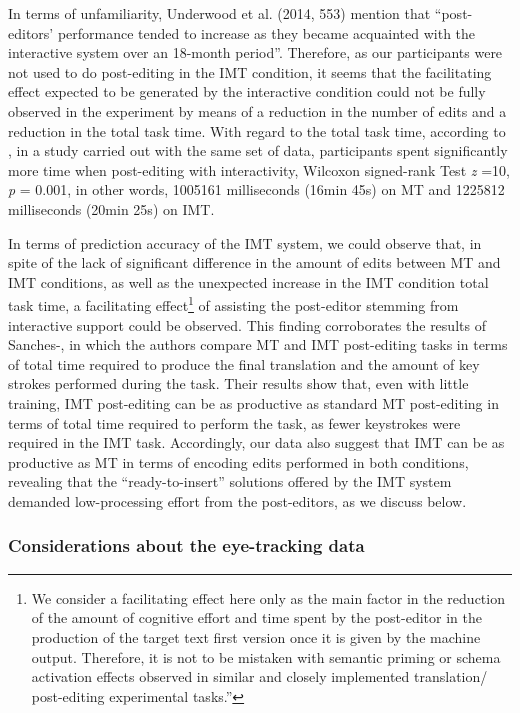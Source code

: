 \documentclass[output=paper]{langsci/langscibook}
\begin{document}
In terms of unfamiliarity, Underwood et al. (2014, 553) mention that “post-editors’ performance tended to increase as they became acquainted with the interactive system over an 18-month period”.  Therefore, as our participants were not used to do post-editing in the IMT condition, it seems that the facilitating effect expected to be generated by the interactive condition could not be fully observed in the experiment by means of a reduction in the number of edits and a reduction in the total task time. With regard to the total task time, according to \citet{AlvesEtAl2015}, in a study carried out with the same set of data, participants spent significantly more time when post-editing with interactivity, Wilcoxon signed-rank Test\textit{ z} =10, \textit{p} = 0.001, in other words, 1005161 milliseconds (16min 45s) on MT and 1225812 milliseconds (20min 25s) on IMT. 



In terms of prediction accuracy of the IMT system, we could observe that, in spite of the lack of significant difference in the amount of edits between MT and IMT conditions, as well as the unexpected increase in the IMT condition total task time, a facilitating effect\footnote{ We consider a facilitating effect here only as the main factor in the reduction of the amount of cognitive effort and time spent by the post-editor in the production of the target text first version once it is given by the machine output. Therefore, it is not to be mistaken with semantic priming or schema activation effects observed in similar and closely implemented translation/ post-editing experimental tasks.”} of assisting the post-editor stemming from interactive support could be observed. This finding corroborates the results of Sanches-\citet{TrillesEtAl2014}, in which the authors compare MT and IMT post-editing tasks in terms of total time required to produce the final translation and the amount of key strokes performed during the task. Their results show that, even with little training, IMT post-editing can be as productive as standard MT post-editing in terms of total time required to perform the task, as fewer keystrokes were required in the IMT task. Accordingly, our data also suggest that IMT can be as productive as MT in terms of encoding edits performed in both conditions, revealing that the “ready-to-insert” solutions offered by the IMT system demanded low-processing effort from the post-editors, as we discuss below.


\subsubsection{Considerations about the eye-tracking data}
\end{document}
